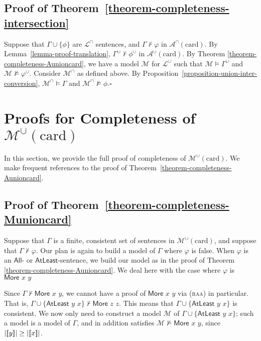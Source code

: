 \documentclass[letterpaper]{article} %
\theoremstyle{definition}
\newcommand{\semantics}[1]{[\![\mbox{\em $ #1 $\/}]\!]}
\newcommand{\Model}{\mathcal{M}}
\newcommand{\set}[1]{\{ #1 \}}
\newcommand{\proves}{\vdash}
\newcommand{\lang}{\mathcal{L}}
\newcommand{\Aunion}{\mathscr{A}^{\cup}}
\newcommand{\Munion}{\mathscr{M}^{\cup}}
\newcommand{\Ainter}{\mathscr{A}^{\cap}}
\newcommand{\proverule}{\textsc}
\newcommand{\raa}{\proverule{raa}}
\newcommand{\Atleast}[2]{\mathsf{AtLeast}\,\,#1\,\,#2}
\newcommand{\More}[2]{\mathsf{More}\,\,#1\,\,#2}
\newcommand{\AllNoArgs}{\mathsf{All}}
\newcommand{\AtleastNoArgs}{\mathsf{AtLeast}}
\newcommand{\card}{\mathrm{card}}
\begin{document}
\subsection*{Proof of Theorem~\ref{theorem-completeness-intersection}}

Suppose that $\Gamma\cup\set{\phi}$ are $\lang^\cap$
sentences, and $\Gamma \not \proves \varphi$ in $\Ainter(\card)$.
By Lemma~\ref{lemma-proof-translation},  $\Gamma^\cup\not\proves\phi^\cup$ in $\Aunion(\card)$.
By Theorem \ref{theorem-completeness-Aunioncard},
we have a model $\Model$ for $\lang^\cup$
such that $\Model \models \Gamma^\cup$ and $\Model \not \models \varphi^\cup$. 
Consider $\Model^\cap$ as defined  above.
By Proposition~\ref{proposition-union-inter-conversion},
$\Model^\cap\models\Gamma$
and $\Model^\cap\not\models\phi$.\hfill$\square$


\section{Proofs for Completeness of $\Munion(\card)$}
\label{s:supp:completeness-Munioncard}

In this section, we provide the full proof of completeness of $\Munion(\card)$.  We make frequent references to the proof of Theorem~\ref{theorem-completeness-Aunioncard}. 

\subsection*{Proof of Theorem~\ref{theorem-completeness-Munioncard}}

Suppose that $\Gamma$ is a finite, consistent set of sentences in $\Munion(\card)$, and suppose that $\Gamma \not \proves \varphi$.  Our plan is again to build a model of $\Gamma$ where $\varphi$ is false.
When $\varphi$ is an $\AllNoArgs$- or $\AtleastNoArgs$-sentence, we build our model as in the proof of Theorem \ref{theorem-completeness-Aunioncard}.  We deal here with the case where $\varphi$ is $\More{x}{y}$

Since $\Gamma \not \proves \More{x}{y}$, we cannot have a proof of $\More{x}{y}$ via (\raa) in particular.  That is, $\Gamma \cup \set{\Atleast{y}{x}} \not \proves \More{z}{z}$.  This means that $\Gamma \cup \set{\Atleast{y}{x}}$ is consistent.  We now only need to construct a model $\Model$ of $\Gamma \cup \set{\Atleast{y}{x}}$; such a model is a model of $\Gamma$, and in addition satisfies $\Model \not \models \More{x}{y}$, since $|\semantics{y}| \ge |\semantics{x}|$.
\end{document}
